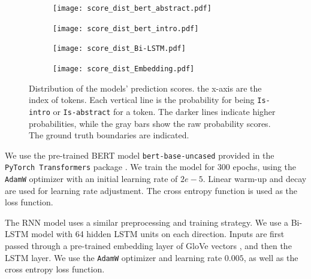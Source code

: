 \begin{figure}
    \centering
    \begin{subfigure}[h]{0.8\textwidth}
        \texttt{[image: score\_dist\_bert\_abstract.pdf]}
        \vspace{-0.3in}
        \caption{}
        \label{fig:score_dist_bert_abstract}
    \end{subfigure}
    \begin{subfigure}[h]{0.8\textwidth}
        \texttt{[image: score\_dist\_bert\_intro.pdf]}
        \vspace{-0.3in}
        \caption{}
        \label{fig:score_dist_bert_intro}
    \end{subfigure}
    \begin{subfigure}[h]{0.8\textwidth}
\texttt{[image: score\_dist\_Bi-LSTM.pdf]}
        \vspace{-0.3in}
        \caption{}
        \label{fig:score_dist_lstm}
    \end{subfigure}
    \begin{subfigure}[b]{0.8\textwidth}
        \texttt{[image: score\_dist\_Embedding.pdf]}
        \vspace{-0.3in}
        \caption{}
        \label{fig:score_dist_embedding}
    \end{subfigure}
    \caption{Distribution of the models' prediction scores. the x-axis are the index of tokens. Each vertical line is the probability for being \texttt{Is-intro} or \texttt{Is-abstract} for a token. The darker lines indicate higher probabilities, while the gray bars show the raw probability scores. The ground truth boundaries are indicated.}\label{fig:score_dist}
\end{figure}


We use the pre-trained BERT model \texttt{bert-base-uncased} provided in the \texttt{PyTorch Transformers} package \cite{Wolf2019HuggingFacesTS}. We train the model for 300 epochs, using the \texttt{AdamW} optimizer with an initial learning rate of $2e-5$. Linear warm-up and decay are used for learning rate adjustment. The cross entropy function is used as the loss function.

The RNN model uses a similar preprocessing and training strategy. We use a Bi-LSTM model with 64 hidden LSTM units on each direction. Inputs are first passed through a pre-trained embedding layer of GloVe vectors \cite{pennington2014glove}, and then the LSTM layer. We use the \texttt{AdamW} optimizer and learning rate $0.005$, as well as the cross entropy loss function.

